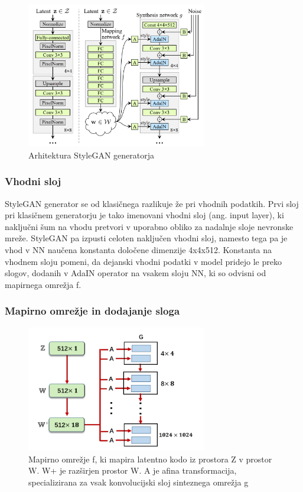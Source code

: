 \documentclass[a4paper,12pt,openright]{book}
\begin{document}
\begin{figure}[htb]
\begin{center}
  \includegraphics[width=0.7\textwidth]{images/stylegan_architecture.png}
\end{center}
  \caption{Arhitektura StyleGAN generatorja \cite{karras2019style}}
  \label{AdaIN}
\end{figure}



\subsubsection{Vhodni sloj}
StyleGAN generator se od klasičnega razlikuje že pri vhodnih podatkih. Prvi sloj pri klasičnem generatorju je tako imenovani vhodni sloj (ang. input layer), ki naključni šum na vhodu pretvori v uporabno obliko za nadalnje sloje nevronske mreže. StyleGAN pa izpusti celoten naključen vhodni sloj, namesto tega pa je vhod v NN naučena konstanta določene dimenzije 4x4x512. Konstanta na vhodnem sloju pomeni, da dejanski vhodni podatki v model pridejo le preko slogov, dodanih v AdaIN operator na vsakem sloju NN, ki so odvisni od mapirnega omrežja f.

\subsubsection{Mapirno omrežje in dodajanje sloga}

\begin{figure}[htb]
\begin{center}
  \includegraphics[width=0.7\textwidth]{images/stylegan_mapping.png}
\end{center}
  \caption{Mapirno omrežje f, ki mapira latentno kodo iz prostora Z v prostor W. W+ je razširjen prostor W. A je afina transformacija, specializirana za vsak konvolucijski sloj sinteznega omrežja g}
  \label{AdaIN}
\end{figure}
\end{document}

